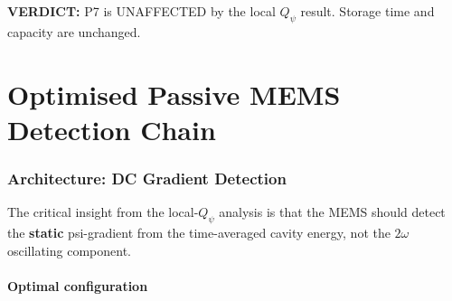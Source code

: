 \documentclass[11pt]{article}
\newcommand{\verdict}[1]{\textcolor{green!50!black}{\textbf{VERDICT:} #1}}
\theoremstyle{definition}
\theoremstyle{remark}
\begin{document}
\verdict{P7 is UNAFFECTED by the local $Q_\psi$ result. Storage
time and capacity are unchanged.}


\part{Optimised Passive MEMS Detection Chain}
\label{part:mems_opt}


\section{Architecture: DC Gradient Detection}
\label{sec:dc_arch}

The critical insight from the local-$Q_\psi$ analysis is that the
MEMS should detect the \textbf{static} psi-gradient from the
time-averaged cavity energy, not the $2\omega$ oscillating component.

\subsection{Optimal configuration}
\end{document}

